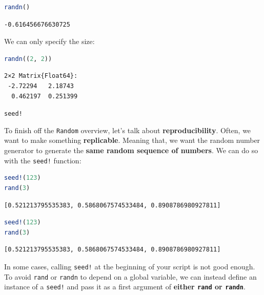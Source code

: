 \documentclass[
  notoc %
]{tufte-book}
\makeatletter
\newcommand{\passthrough}[1]{#1}
\renewcommand\subsubsection{%
\@startsection{subsubsection}{3}{\z@ }{-3.25ex\@plus -1ex \@minus -.2ex}{1.5ex \@plus .2ex}{\normalfont \normalsize \bfseries }
}
\makeatother
\begin{document}
\begin{lstlisting}[language=Julia]
randn()
\end{lstlisting}

\begin{lstlisting}[language=Output]
-0.616456676630725
\end{lstlisting}

We can only specify the size:

\begin{lstlisting}[language=Julia]
randn((2, 2))
\end{lstlisting}

\begin{lstlisting}[language=Output]
2×2 Matrix{Float64}:
 -2.72294   2.18743
  0.462197  0.251399
\end{lstlisting}

\hypertarget{sec:random_seed}{%
\subsubsection{\texorpdfstring{\texttt{seed!}}{seed!}}\label{sec:random_seed}}

To finish off the \passthrough{\lstinline!Random!} overview, let's talk
about \textbf{reproducibility}. Often, we want to make something
\textbf{replicable}. Meaning that, we want the random number generator
to generate the \textbf{same random sequence of numbers}. We can do so
with the \passthrough{\lstinline"seed!"} function:

\begin{lstlisting}[language=Julia]
seed!(123)
rand(3)
\end{lstlisting}

\begin{lstlisting}[language=Output]
[0.521213795535383, 0.5868067574533484, 0.8908786980927811]
\end{lstlisting}

\begin{lstlisting}[language=Julia]
seed!(123)
rand(3)
\end{lstlisting}

\begin{lstlisting}[language=Output]
[0.521213795535383, 0.5868067574533484, 0.8908786980927811]
\end{lstlisting}

In some cases, calling \passthrough{\lstinline"seed!"} at the beginning
of your script is not good enough. To avoid
\passthrough{\lstinline!rand!} or \passthrough{\lstinline!randn!} to
depend on a global variable, we can instead define an instance of a
\passthrough{\lstinline"seed!"} and pass it as a first argument of
\textbf{either \passthrough{\lstinline!rand!} or
\passthrough{\lstinline!randn!}}.
\end{document}
